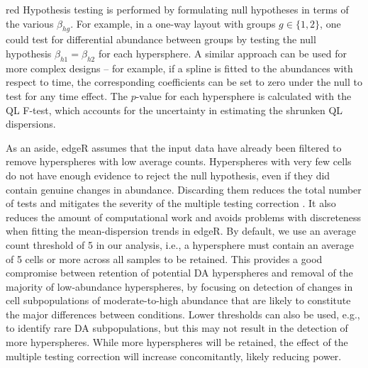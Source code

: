 \documentclass{article}
\begin{document}
\begin{color}{red}
Hypothesis testing is performed by formulating null hypotheses in terms of the various $\beta_{hg}$.
For example, in a one-way layout with groups $g\in\{1,2\}$, one could test for differential abundance between groups by testing the null hypothesis $\beta_{h1}=\beta_{h2}$ for each hypersphere.
A similar approach can be used for more complex designs -- for example, if a spline is fitted to the abundances with respect to time, the corresponding coefficients can be set to zero under the null to test for any time effect.
The $p$-value for each hypersphere is calculated with the QL F-test, which accounts for the uncertainty in estimating the shrunken QL dispersions. 

As an aside, edgeR assumes that the input data have already been filtered to remove hyperspheres with low average counts.
Hyperspheres with very few cells do not have enough evidence to reject the null hypothesis, even if they did contain genuine changes in abundance.
Discarding them reduces the total number of tests and mitigates the severity of the multiple testing correction \cite{bourgon2010independent}.
It also reduces the amount of computational work and avoids problems with discreteness when fitting the mean-dispersion trends in edgeR.
By default, we use an average count threshold of 5 in our analysis, i.e., a hypersphere must contain an average of 5 cells or more across all samples to be retained.
This provides a good compromise between retention of potential DA hyperspheres and removal of the majority of low-abundance hyperspheres,
by focusing on detection of changes in cell subpopulations of moderate-to-high abundance that are likely to constitute the major differences between conditions. 
Lower thresholds can also be used, e.g., to identify rare DA subpopulations, but this may not result in the detection of more hyperspheres. 
While more hyperspheres will be retained, the effect of the multiple testing correction will increase concomitantly, likely reducing power.
\end{color}
\end{document}
